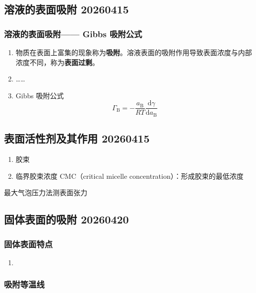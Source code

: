 \subsection{溶液的表面吸附 20260415}

\subsubsection{溶液的表面吸附—— Gibbs 吸附公式}

\begin{enumerate}
    \item 物质在表面上富集的现象称为\textbf{吸附}。溶液表面的吸附作用导致表面浓度与内部浓度不同，称为\textbf{表面过剩}。
    \item ……
    \item Gibbs 吸附公式
    \begin{equation}
        \Gamma_{\mathrm{B}} = -\frac{a_{\mathrm{B}}}{RT}\frac{\mathrm{d} \gamma}{\mathrm{d} a_{\mathrm{B}}}
    \end{equation}
\end{enumerate}
\subsection{表面活性剂及其作用 20260415}

\begin{enumerate}
    \item 胶束
    \item 临界胶束浓度 CMC（critical micelle concentration）：形成胶束的最低浓度
\end{enumerate}

最大气泡压力法测表面张力

\subsection{固体表面的吸附 20260420}

\subsubsection{固体表面特点}

\begin{enumerate}
    \item 
\end{enumerate}

\subsubsection{吸附等温线}

